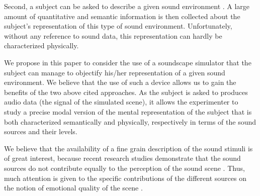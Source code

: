 \documentclass[preprint,12pt]{elsarticle}
\newcommand{\ie}{\emph{i.\,e.}}
\newcommand{\eg}{\emph{e.\,g.}}
\begin{document}
Second, a subject can be asked to describe a given sound environment \cite{guastavino2006ideal, dubois2006cognitive}. A large amount of quantitative and semantic information is then collected about the subject's representation of this type of sound environment. Unfortunately, without any reference to sound data, this representation can hardly be characterized physically.


We propose in this paper to consider the use of a soundscape simulator that the subject can manage to objectify his/her representation of a given sound environment. We believe that the use of such a device allows us to gain the benefits of the two above cited approaches. As the subject is asked to produces audio data (the signal of the simulated scene), it allows the experimenter to study a precise modal version of the mental representation of the subject that is both characterized semantically and physically, respectively in terms of the sound sources and their levels.


We believe that the availability of a fine grain description of the sound stimuli is of great interest, because recent research studies demonstrate that the sound sources do not contribute equally to the perception of the sound scene \cite{defreville2004aactivity,lavandier2006contribution,guastavino2006ideal,nilsson2007soundscape,
szeremeta2009analysis}. Thus, much attention is given to the specific contributions of the different sources on the notion of emotional quality of the scene \cite{gozalo2015relationship,ricciardi2015sound}.
\end{document}
